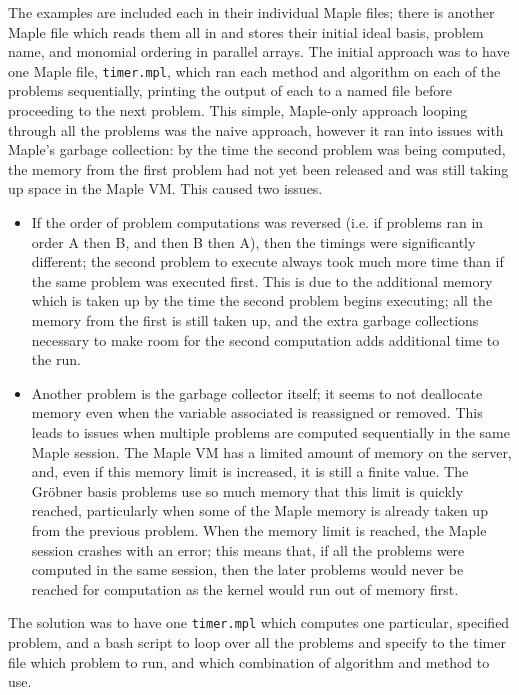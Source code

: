 \documentclass[letterpaper,12pt,titlepage,oneside,final]{book}
\begin{document}
\begin{appendices}
The examples are included each in their individual Maple files; there is another Maple file which reads them all in and stores their initial ideal basis, problem name, and monomial ordering in parallel arrays.  The initial approach was to have one Maple file, \texttt{timer.mpl}, which ran each method and algorithm on each of the problems sequentially, printing the output of each to a named file before proceeding to the next problem.  This simple, Maple-only approach looping through all the problems was the naive approach, however it ran into issues with Maple's garbage collection: by the time the second problem was being computed, the memory from the first problem had not yet been released and was still taking up space in the Maple VM.  This caused two issues.
\begin{itemize}
  \item If the order of problem computations was reversed (i.e. if problems ran in order A then B, and then B then A), then the timings were significantly different; the second problem to execute always took much more time than if the same problem was executed first.  This is due to the additional memory which is taken up by the time the second problem begins executing; all the memory from the first is still taken up, and the extra garbage collections necessary to make room for the second computation adds additional time to the run.
  \item Another problem is the garbage collector itself; it seems to not deallocate memory even when the variable associated is reassigned or removed.  This leads to issues when multiple problems are computed sequentially in the same Maple session.  The Maple VM has a limited amount of memory on the server, and, even if this memory limit is increased, it is still a finite value.  The Gr\"obner basis problems use so much memory that this limit is quickly reached, particularly when some of the Maple memory is already taken up from the previous problem.  When the memory limit is reached, the Maple session crashes with an error; this means that, if all the problems were computed in the same session, then the later problems would never be reached for computation as the kernel would run out of memory first.  
\end{itemize} 
The solution was to have one \texttt{timer.mpl} which computes one particular, specified problem, and a bash script to loop over all the problems and specify to the timer file which problem to run, and which combination of algorithm and method to use.


\end{appendices}
\end{document}
